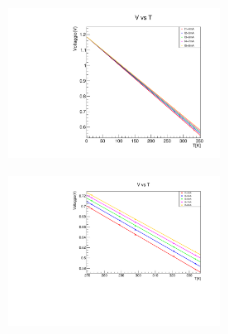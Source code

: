 \documentclass[10pt,twocolumn]{article}
\begin{document}
\begin{figure}[H] %
  \centering
  \includegraphics[width=0.5\textwidth]{V_vs_T.pdf} %
  \label{fig:V}
\end{figure}
\begin{figure}[H] %
  \centering
  \includegraphics[width=0.5\textwidth]{V_vs_T_lim.pdf} %
  \label{fig:V_I_}
\end{figure}
\end{document}
